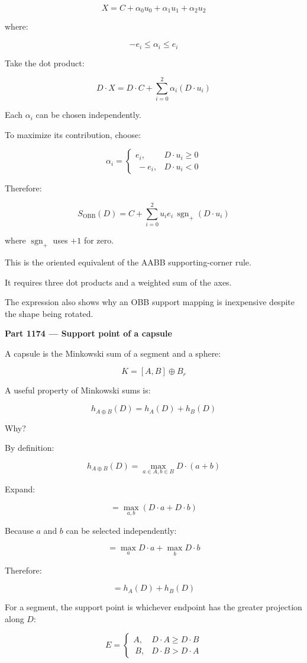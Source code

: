\[
X=C+\alpha_0u_0+\alpha_1u_1+\alpha_2u_2
\]

where:

\[
-e_i\le\alpha_i\le e_i
\]

Take the dot product:

\[
D\cdot X= D\cdot C+ \sum_{i=0}^2\alpha_i(D\cdot u_i)
\]

Each \(\alpha_i\) can be chosen independently.

To maximize its contribution, choose:

\[
\alpha_i= \begin{cases} e_i,&D\cdot u_i\ge0\\\ -e_i,&D\cdot u_i<0 \end{cases}
\]

Therefore:

\[
\boxed{ S_{\mathrm{OBB}}(D)= C+\sum_{i=0}^2 u_i e_i\,\operatorname{sgn}_+(D\cdot u_i) }
\]

where \(\operatorname{sgn}_+\) uses \(+1\) for zero.

This is the oriented equivalent of the AABB supporting-corner rule.

It requires three dot products and a weighted sum of the axes.

The expression also shows why an OBB support mapping is inexpensive despite the shape being rotated.

\textbf{Part 1174 --- Support point of a capsule}

A capsule is the Minkowski sum of a segment and a sphere:

\[
K=[A,B]\oplus B_r
\]

A useful property of Minkowski sums is:

\[
\boxed{ h_{A\oplus B}(D)=h_A(D)+h_B(D) }
\]

Why?

By definition:

\[
h_{A\oplus B}(D) = \max_{a\in A,b\in B}D\cdot(a+b)
\]

Expand:

\[
=\max_{a,b}(D\cdot a+D\cdot b)
\]

Because \(a\) and \(b\) can be selected independently:

\[
=\max_a D\cdot a+\max_b D\cdot b
\]

Therefore:

\[
=h_A(D)+h_B(D)
\]

For a segment, the support point is whichever endpoint has the greater projection along \(D\):

\[
E= \begin{cases} A,&D\cdot A\ge D\cdot B\\\ B,&D\cdot B>D\cdot A \end{cases}
\]

